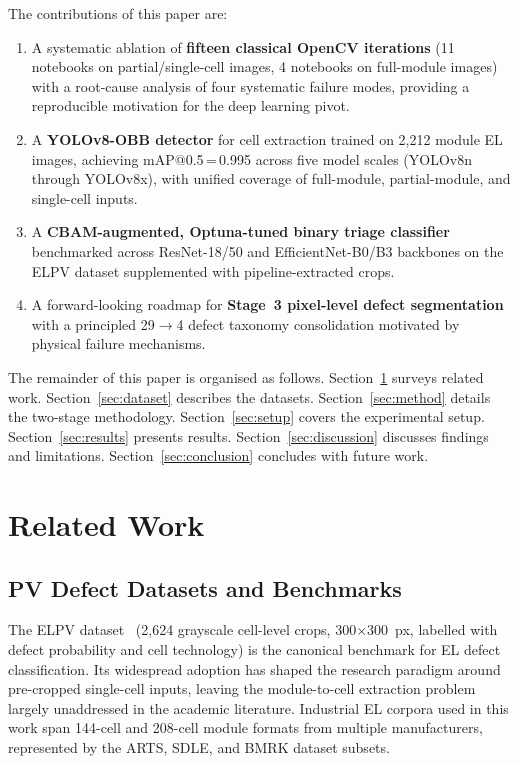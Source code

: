\documentclass[conference]{IEEEtran}
\begin{document}
The contributions of this paper are:
\begin{enumerate}
  \item A systematic ablation of \textbf{fifteen classical
        OpenCV iterations} (11 notebooks on partial/single-cell
        images, 4 notebooks on full-module images) with a
        root-cause analysis of four systematic failure modes,
        providing a reproducible motivation for the deep learning
        pivot.
  \item A \textbf{YOLOv8-OBB detector} for cell extraction
        trained on 2{,}212 module EL images, achieving
        mAP@0.5\,=\,0.995 across five model scales
        (YOLOv8n through YOLOv8x), with unified coverage
        of full-module, partial-module, and single-cell inputs.
  \item A \textbf{CBAM-augmented, Optuna-tuned binary triage
        classifier} benchmarked across ResNet-18/50 and
        EfficientNet-B0/B3 backbones on the ELPV dataset
        supplemented with pipeline-extracted crops.
  \item A forward-looking roadmap for \textbf{Stage~3
        pixel-level defect segmentation} with a principled
        29$\to$4 defect taxonomy consolidation motivated by
        physical failure mechanisms.
\end{enumerate}

The remainder of this paper is organised as follows.
Section~\ref{sec:related} surveys related work.
Section~\ref{sec:dataset} describes the datasets.
Section~\ref{sec:method} details the two-stage methodology.
Section~\ref{sec:setup} covers the experimental setup.
Section~\ref{sec:results} presents results.
Section~\ref{sec:discussion} discusses findings and limitations.
Section~\ref{sec:conclusion} concludes with future work.

\section{Related Work}
\label{sec:related}

\subsection{PV Defect Datasets and Benchmarks}
The ELPV dataset~\cite{deitsch2019} (2{,}624 grayscale
cell-level crops, 300$\times$300~px, labelled with defect
probability and cell technology) is the canonical benchmark
for EL defect classification. Its widespread adoption has
shaped the research paradigm around pre-cropped single-cell
inputs, leaving the module-to-cell extraction problem largely
unaddressed in the academic literature. Industrial EL corpora
used in this work span 144-cell and 208-cell module formats
from multiple manufacturers, represented by the ARTS, SDLE,
and BMRK dataset subsets.
\end{document}

